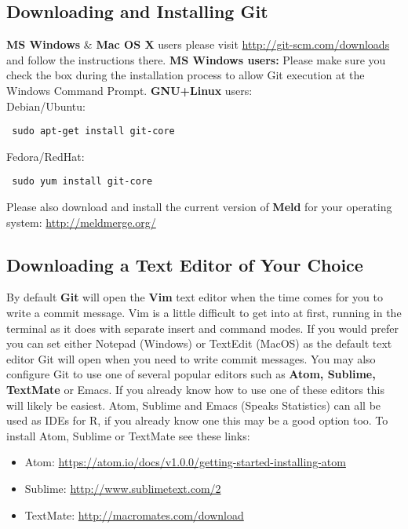 \documentclass{article}[12pt]
\begin{document}
\subsection*{Downloading and Installing Git}
\textbf{MS Windows} \& \textbf{Mac OS X} users please visit \url{http://git-scm.com/downloads} and follow the instructions there.
\newline
\newline
\textbf{MS Windows users:} Please make sure you check the box during the installation process to allow Git execution at the Windows Command Prompt.
\newline
\newline
\textbf{GNU+Linux} users:\\
Debian/Ubuntu: \begin{verbatim} sudo apt-get install git-core \end{verbatim} 
Fedora/RedHat: \begin{verbatim} sudo yum install git-core \end{verbatim}

Please also download and install the current version of \textbf{Meld} for your operating system: \url{http://meldmerge.org/}

\subsection*{Downloading a Text Editor of Your Choice}
By default \textbf{Git} will open the \textbf{Vim} text editor when the time comes for you to write a commit message.
Vim is a little difficult to get into at first, running in the terminal as it does with separate insert and command modes.
If you would prefer you can set either Notepad (Windows) or TextEdit (MacOS) as the default text editor Git will open when you need to write commit messages.  
You may also configure Git to use one of several popular editors such as \textbf{Atom, Sublime, TextMate} or Emacs.
If you already know how to use one of these editors this will likely be easiest.  
Atom, Sublime and Emacs (Speaks Statistics) can all be used as IDEs for R, if you already know one this may be a good option too.
\newline
\newline
To install Atom, Sublime or TextMate see these links: \begin{itemize}
\item Atom: \url{https://atom.io/docs/v1.0.0/getting-started-installing-atom}
\item Sublime: \url{http://www.sublimetext.com/2}
\item TextMate: \url{http://macromates.com/download}
\end{itemize}
\end{document}
